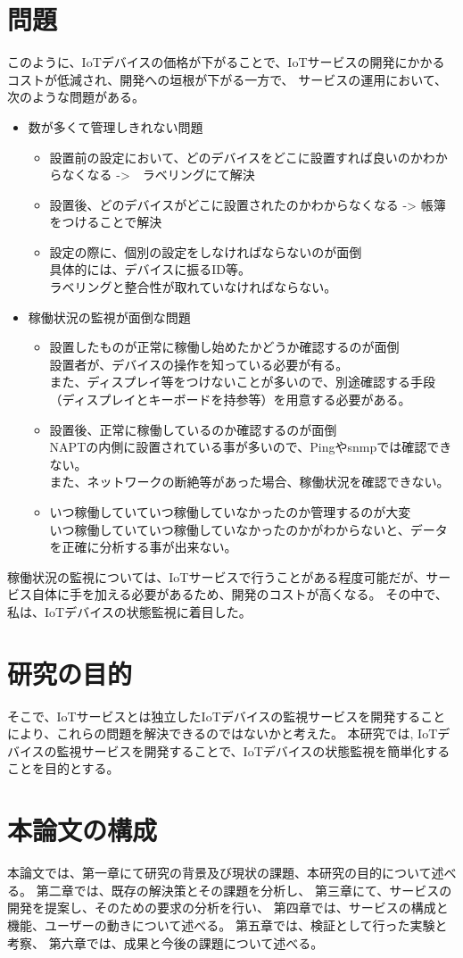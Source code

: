 \section{問題}
このように、IoTデバイスの価格が下がることで、IoTサービスの開発にかかるコストが低減され、開発への垣根が下がる一方で、
サービスの運用において、次のような問題がある。
\begin{itemize}
	\item 数が多くて管理しきれない問題
	\begin{itemize}
		\item 設置前の設定において、どのデバイスをどこに設置すれば良いのかわからなくなる ->　ラベリングにて解決
		\item 設置後、どのデバイスがどこに設置されたのかわからなくなる -> 帳簿をつけることで解決
		\item 設定の際に、個別の設定をしなければならないのが面倒\\
			具体的には、デバイスに振るID等。\\
			ラベリングと整合性が取れていなければならない。
	\end{itemize}
	\item 稼働状況の監視が面倒な問題
	\begin{itemize}
		\item 設置したものが正常に稼働し始めたかどうか確認するのが面倒\\
			設置者が、デバイスの操作を知っている必要が有る。\\
			また、ディスプレイ等をつけないことが多いので、別途確認する手段（ディスプレイとキーボードを持参等）を用意する必要がある。
		\item 設置後、正常に稼働しているのか確認するのが面倒\\
			NAPTの内側に設置されている事が多いので、Pingやsnmpでは確認できない。\\
			また、ネットワークの断絶等があった場合、稼働状況を確認できない。
		\item いつ稼働していていつ稼働していなかったのか管理するのが大変\\
			いつ稼働していていつ稼働していなかったのかがわからないと、データを正確に分析する事が出来ない。
	\end{itemize}
\end{itemize}
稼働状況の監視については、IoTサービスで行うことがある程度可能だが、サービス自体に手を加える必要があるため、開発のコストが高くなる。
その中で、私は、IoTデバイスの状態監視に着目した。

\section{研究の目的}
そこで、IoTサービスとは独立したIoTデバイスの監視サービスを開発することにより、これらの問題を解決できるのではないかと考えた。
本研究では, IoTデバイスの監視サービスを開発することで、IoTデバイスの状態監視を簡単化することを目的とする。


\section{本論文の構成}
本論文では、第一章にて研究の背景及び現状の課題、本研究の目的について述べる。
第二章では、既存の解決策とその課題を分析し、
第三章にて、サービスの開発を提案し、そのための要求の分析を行い、
第四章では、サービスの構成と機能、ユーザーの動きについて述べる。
第五章では、検証として行った実験と考察、
第六章では、成果と今後の課題について述べる。

